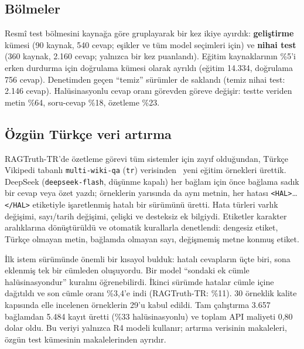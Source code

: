 \documentclass[conference,a4paper]{IEEEtran}
\begin{document}
\subsection{Bölmeler}
Resmî test bölmesini kaynağa göre gruplayarak bir kez ikiye ayırdık: \textbf{geliştirme} kümesi (90 kaynak, 540 cevap; eşikler ve tüm model seçimleri için) ve \textbf{nihai test} (360 kaynak, 2.160 cevap; yalnızca bir kez puanlandı). Eğitim kaynaklarının \%5'i erken durdurma için doğrulama kümesi olarak ayrıldı (eğitim 14.334, doğrulama 756 cevap). Denetimden geçen ``temiz'' sürümler de saklandı (temiz nihai test: 2.146 cevap). Halüsinasyonlu cevap oranı görevden göreve değişir: testte veriden metin \%64, soru-cevap \%18, özetleme \%23.

\subsection{Özgün Türkçe veri artırma}
RAGTruth-TR'de özetleme görevi tüm sistemler için zayıf olduğundan, Türkçe Vikipedi tabanlı \texttt{multi-wiki-qa} (\texttt{tr}) verisinden~\cite{thoresen2026multiwiki} yeni eğitim örnekleri ürettik. DeepSeek (\texttt{deepseek-flash}, düşünme kapalı) her bağlam için önce bağlama sadık bir cevap veya özet yazdı; örneklerin yarısında da aynı metnin, her hatası \texttt{<HAL>}\ldots\texttt{</HAL>} etiketiyle işaretlenmiş hatalı bir sürümünü üretti. Hata türleri varlık değişimi, sayı/tarih değişimi, çelişki ve desteksiz ek bilgiydi. Etiketler karakter aralıklarına dönüştürüldü ve otomatik kurallarla denetlendi: dengesiz etiket, Türkçe olmayan metin, bağlamda olmayan sayı, değişmemiş metne konmuş etiket.

İlk istem sürümünde önemli bir kısayol bulduk: hatalı cevapların üçte biri, sona eklenmiş tek bir cümleden oluşuyordu. Bir model ``sondaki ek cümle halüsinasyondur'' kuralını öğrenebilirdi. İkinci sürümde hatalar cümle içine dağıtıldı ve son cümle oranı \%3{,}4'e indi (RAGTruth-TR: \%11). 30 örneklik kalite kapısında elle incelenen örneklerin 29'u kabul edildi. Tam çalıştırma 3.657 bağlamdan 5.484 kayıt üretti (\%33 halüsinasyonlu) ve toplam API maliyeti 0{,}80 dolar oldu. Bu veriyi yalnızca R4 modeli kullanır; artırma verisinin makaleleri, özgün test kümesinin makalelerinden ayrıdır.
\end{document}
